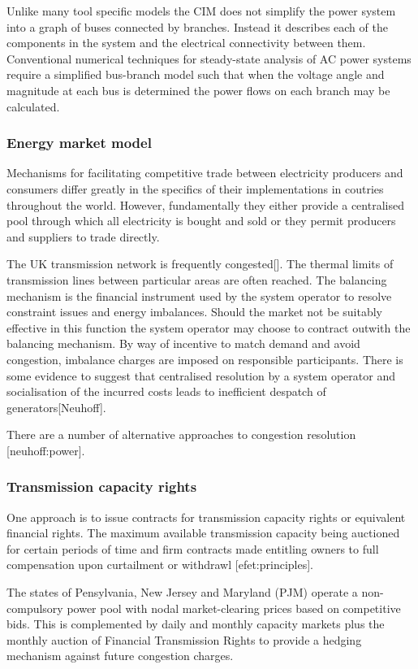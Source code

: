 Unlike many tool specific models the CIM does not simplify the power system
into a graph of buses connected by branches.  Instead it describes each of the
components in the system and the electrical connectivity between them.
Conventional numerical techniques for steady-state analysis of AC power
systems require a simplified bus-branch model such that when the voltage angle
and magnitude at each bus is determined the power flows on each branch may be
calculated.


\subsubsection{Energy market model}
Mechanisms for facilitating competitive trade between electricity producers and
consumers differ greatly in the specifics of their implementations in coutries
throughout the world.  However, fundamentally they either provide a
centralised pool through which all electricity is bought and sold or they
permit producers and suppliers to trade directly.

The UK transmission network is frequently congested[].  The thermal limits of
transmission lines between particular areas are often reached.  The balancing
mechanism is the financial instrument used by the system operator to resolve
constraint issues and energy imbalances.  Should the market not be suitably
effective in this function the system operator may choose to contract outwith
the balancing mechanism.  By way of incentive to match demand and avoid
congestion, imbalance charges are imposed on responsible participants.  There
is some evidence to suggest that centralised resolution by a system operator
and socialisation of the incurred costs leads to inefficient despatch of
generators[Neuhoff].

There are a number of alternative approaches to congestion resolution
[neuhoff:power].


\subsubsection{Transmission capacity rights}
One approach is to issue contracts for transmission capacity rights or
equivalent financial rights.  The maximum available transmission capacity
being auctioned for certain periods of time and firm contracts made entitling
owners to full compensation upon curtailment or withdrawl [efet:principles].

The states of Pensylvania, New Jersey and Maryland (PJM) operate a
non-compulsory power pool with nodal market-clearing prices based on
competitive bids.  This is complemented by daily and monthly capacity markets
plus the monthly auction of Financial Transmission Rights to provide a hedging
mechanism against future congestion charges.


